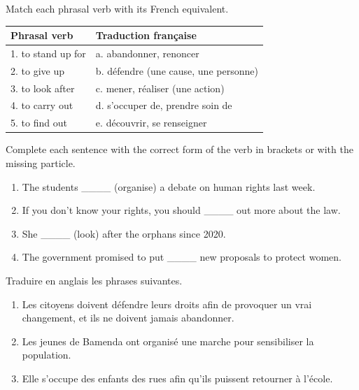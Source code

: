 \documentclass[11pt]{article}
\newcounter{popsec}
\newcounter{popsub}
\newcommand{\courssub}[1]{%
  \stepcounter{popsub}%
  \par\vspace{9pt}\noindent{\popxbold\fontsize{11.5}{13}\selectfont\color{popink}{\color{poporange}\thepopsec.\thepopsub}\hspace{6pt}#1}\par\nopagebreak\vspace{4pt}
}
\begin{document}
\begin{exercice}
Match each phrasal verb with its French equivalent.
\begin{center}
\begin{tabularx}{\linewidth}{|X|X|}
\hline
\rowcolor{popblueL} \textbf{Phrasal verb} & \textbf{Traduction française} \\
\hline
1. to stand up for & a. abandonner, renoncer \\
\hline
2. to give up & b. défendre (une cause, une personne) \\
\hline
3. to look after & c. mener, réaliser (une action) \\
\hline
4. to carry out & d. s'occuper de, prendre soin de \\
\hline
5. to find out & e. découvrir, se renseigner \\
\hline
\end{tabularx}
\end{center}
\end{exercice}

\begin{exercice}
Complete each sentence with the correct form of the verb in brackets or with the missing particle.
\begin{enumerate}
\item The students \_\_\_\_ (organise) a debate on human rights last week.
\item If you don't know your rights, you should \_\_\_\_ out more about the law.
\item She \_\_\_\_ (look) after the orphans since 2020.
\item The government promised to put \_\_\_\_ new proposals to protect women.
\end{enumerate}
\end{exercice}

\courssub{Je m'entraîne}

\begin{exercice}
Traduire en anglais les phrases suivantes.
\begin{enumerate}
\item Les citoyens doivent défendre leurs droits afin de provoquer un vrai changement, et ils ne doivent jamais abandonner.
\item Les jeunes de Bamenda ont organisé une marche pour sensibiliser la population.
\item Elle s'occupe des enfants des rues afin qu'ils puissent retourner à l'école.
\end{enumerate}
\end{exercice}
\end{document}
